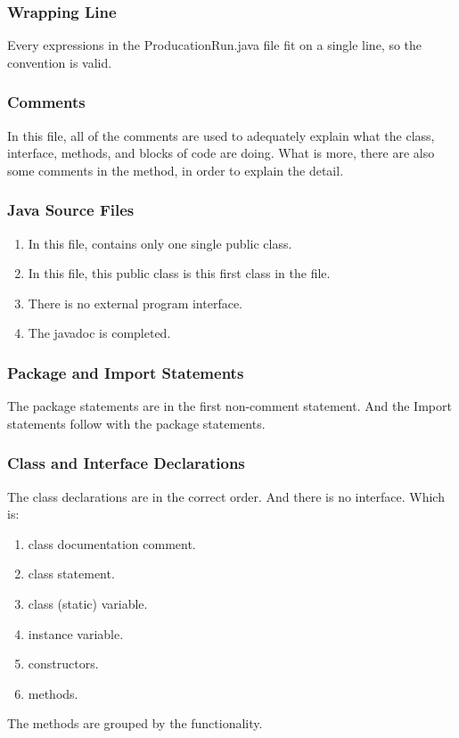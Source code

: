 \documentclass{article}
\begin{document}
\subsubsection{Wrapping Line}
Every expressions in the ProducationRun.java file fit on a single line, so the convention is valid.

\subsubsection{Comments}
In this file, all of the comments are used to adequately explain what the class, interface, methods, and blocks of code are doing.
What is more, there are also some comments in the method, in order to explain the detail.

\subsubsection{Java Source Files}
\begin{enumerate}
	\item In this file, contains only one single public class. \newline
	\item In this file, this public class is this first class in the file. \newline
	\item There is no external program interface. \newline
	\item The javadoc is completed.
\end{enumerate}

\subsubsection{Package and Import Statements}
The package statements are in the first non-comment statement.\newline
And the Import statements follow with the package statements.

\subsubsection{Class and Interface Declarations}
The class declarations are in the correct order. And there is no interface.\newline
Which is:\newline
\begin{enumerate}
	\item class documentation comment.
	\item class statement.
	\item class (static) variable.
	\item instance variable.
	\item constructors.
	\item methods.
\end{enumerate}
The methods are grouped by the functionality.\newline
\end{document}
